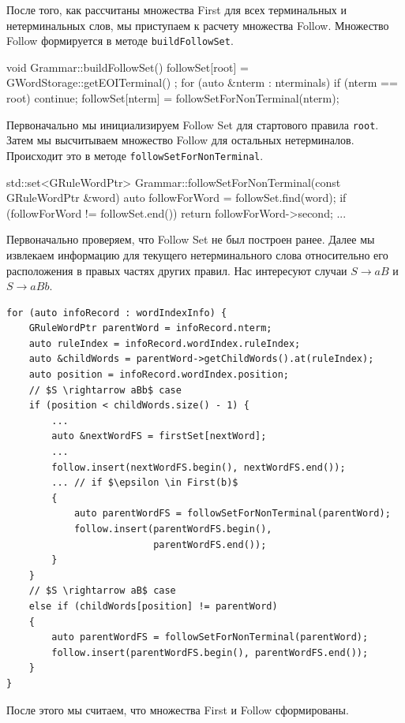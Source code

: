 После того, как рассчитаны множества First для всех терминальных и нетерминальных слов, мы приступаем к расчету множества Follow. Множество Follow формируется в методе \lstinline{buildFollowSet}.
\begin{Verb}
void Grammar::buildFollowSet() {
    followSet[root] = { GWordStorage::getEOITerminal() };
    for (auto &nterm : nterminals) {
        if (nterm == root)
            continue;
        followSet[nterm] = followSetForNonTerminal(nterm);
    }
}
\end{Verb}
Первоначально мы инициализируем Follow Set для стартового правила \lstinline{root}. Затем мы высчитываем множество Follow для остальных нетерминалов. Происходит это в методе \lstinline{followSetForNonTerminal}.
\begin{Verb}
std::set<GRuleWordPtr> 
Grammar::followSetForNonTerminal(const GRuleWordPtr &word) 
{
    auto followForWord = followSet.find(word);
    if (followForWord != followSet.end()) {
        return  followForWord->second;
    }
    ...
}
\end{Verb}
Первоначально проверяем, что Follow Set не был построен ранее. Далее мы извлекаем информацию для текущего нетерминального слова относительно его расположения в правых частях других правил. Нас интересуют случаи $S \rightarrow aB$ и $S \rightarrow aBb$.
\begin{lstlisting}[mathescape]
for (auto infoRecord : wordIndexInfo) {
    GRuleWordPtr parentWord = infoRecord.nterm;
    auto ruleIndex = infoRecord.wordIndex.ruleIndex;
    auto &childWords = parentWord->getChildWords().at(ruleIndex);
    auto position = infoRecord.wordIndex.position;
    // $S \rightarrow aBb$ case
    if (position < childWords.size() - 1) {
        ...
        auto &nextWordFS = firstSet[nextWord];
        ...
        follow.insert(nextWordFS.begin(), nextWordFS.end());
        ... // if $\epsilon \in First(b)$
        {
            auto parentWordFS = followSetForNonTerminal(parentWord);
            follow.insert(parentWordFS.begin(), 
                          parentWordFS.end());
        }
    }
    // $S \rightarrow aB$ case
    else if (childWords[position] != parentWord) 
    {
        auto parentWordFS = followSetForNonTerminal(parentWord);
        follow.insert(parentWordFS.begin(), parentWordFS.end());
    }
}
\end{lstlisting}
После этого мы считаем, что множества First и Follow сформированы.

